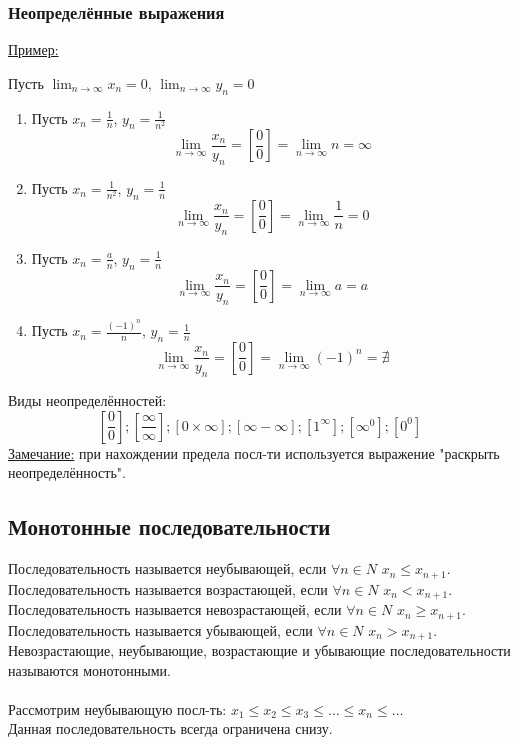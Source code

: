\documentclass[12pt]{article}
\begin{document}
    \subsubsection*{Неопределённые выражения}
    \noindent \underline{Пример:}
    \begin{adjustwidth}{1.5em}{1.5em}
        Пусть $\lim_{n\to\infty}x_n = 0$, $\lim_{n\to\infty}y_n = 0$
        \begin{enumerate}
            \item Пусть $x_n = \frac{1}{n}$, $y_n = \frac{1}{n^2}$
            \[ \lim_{n\to\infty}\frac{x_n}{y_n} = \left[\frac{0}{0}\right] = \lim_{n\to\infty}n = \infty \]
            \item Пусть $x_n = \frac{1}{n^2}$, $y_n = \frac{1}{n}$
            \[ \lim_{n\to\infty}\frac{x_n}{y_n} = \left[\frac{0}{0}\right] = \lim_{n\to\infty}\frac{1}{n} = 0 \]
            \item Пусть $x_n = \frac{a}{n}$, $y_n = \frac{1}{n}$
            \[ \lim_{n\to\infty}\frac{x_n}{y_n} = \left[\frac{0}{0}\right] = \lim_{n\to\infty}a = a \]
            \item Пусть $x_n = \frac{(-1)^n}{n}$, $y_n = \frac{1}{n}$
            \[ \lim_{n\to\infty}\frac{x_n}{y_n} = \left[\frac{0}{0}\right] = \lim_{n\to\infty}(-1)^n = \nexists \]
        \end{enumerate}
    \end{adjustwidth}
    Виды неопределённостей:
    \[
        \left[\frac{0}{0}\right];
        \left[\frac{\infty}{\infty}\right];
        \left[0 \times \infty\right];
        \left[\infty - \infty\right];
        \left[1^\infty\right];
        \left[\infty^0\right]; 
        \left[0^0\right]
    \]
    \underline{Замечание:} при нахождении предела посл-ти используется выражение "раскрыть неопределённость".

    \subsection{Монотонные последовательности}
    \noindent Последовательность называется неубывающей, если $\forall n \in N$ $x_n \le x_{n+1}$.\\
    Последовательность называется возрастающей, если $\forall n \in N$ $x_n < x_{n+1}$.\\
    Последовательность называется невозрастающей, если $\forall n \in N$ $x_n \ge x_{n+1}$.\\
    Последовательность называется убывающей, если $\forall n \in N$ $x_n > x_{n+1}$.\\
    Невозрастающие, неубывающие, возрастающие и убывающие последовательности называются монотонными.\\\\
    Рассмотрим неубывающую посл-ть: $x_{1} \le x_{2} \le x_{3} \le \dots \le x_n \le \dots$\\
    Данная последовательность всегда ограничена снизу.\par
\end{document}
